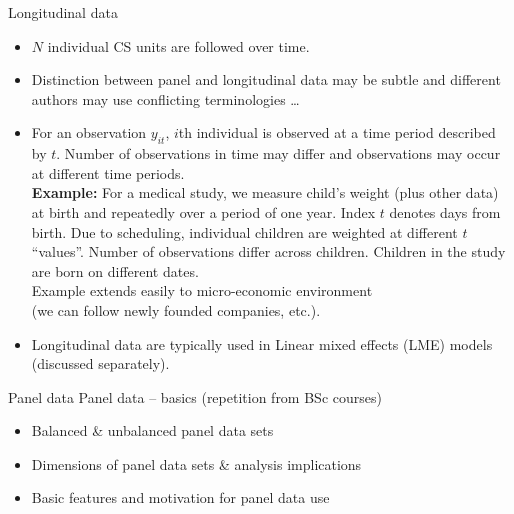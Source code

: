\documentclass[usenames,dvipsnames]{beamer}
\begin{document}
\begin{frame}{Longitudinal data}
\footnotesize
\begin{itemize}
\item $N$ individual CS units are followed over time.
\medskip
\item Distinction between panel and longitudinal data may be subtle and different authors may use conflicting terminologies \dots
\medskip
\item For an observation $y_{it}$, $i$th individual is observed at a time period described by $t$. Number of observations in time may differ and observations may occur at different time periods. \\ \medskip 
\textbf{Example:} For a medical study, we measure child's weight (plus other data) at birth and repeatedly over a period of one year. Index $t$ denotes days from birth. Due to scheduling, individual children are weighted at different $t$ ``values''. Number of observations differ across children. Children in the study are born on different dates. \\ \medskip Example extends easily to micro-economic environment \\(we can follow newly founded companies, etc.).
\medskip
\item Longitudinal data are typically used in Linear mixed effects (LME) models (discussed separately).
\end{itemize}
\end{frame}
\begin{frame}{Panel data}
Panel data -- basics (repetition from BSc courses) \\ \bigskip
\begin{itemize}
\bigskip
\item Balanced \& unbalanced panel data sets
\bigskip
\item Dimensions of panel data sets \& analysis implications
\bigskip
\item Basic features and motivation for panel data use
\end{itemize}
\end{frame}
\end{document}

